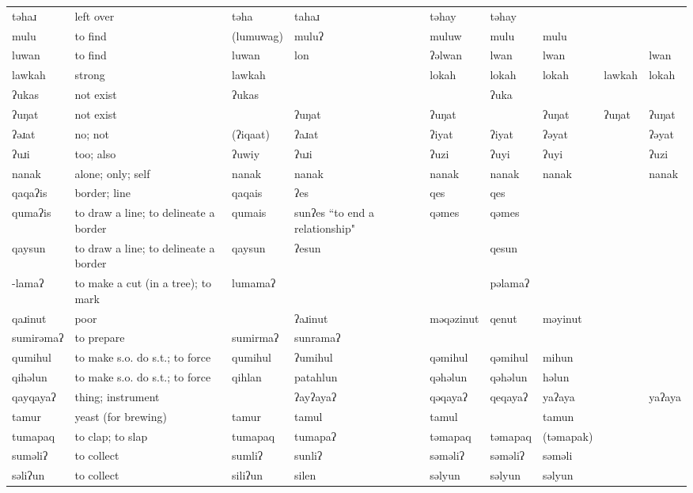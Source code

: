 \begin{landscape}
\begin{longtable}{*{9}{p{}}}
\text{*}təhaɹ & left over & təha & tahaɹ & təhay & təhay &  &  & \\
\text{*}mulu & to find & (lumuwag) & muluʔ & muluw & mulu & mulu &  & \\
\text{*}luwan & to find & luwan & lon & ʔəlwan & lwan & lwan &  & lwan\\
\text{*}lawkah & strong & lawkah &  & lokah & lokah & lokah & lawkah & lokah\\
\text{*}ʔukas & not exist & ʔukas &  &  & ʔuka &  &  & \\
\text{*}ʔuŋat & not exist &  & ʔuŋat & ʔuŋat &  & ʔuŋat & ʔuŋat & ʔuŋat\\
\text{*}ʔəɹat & no; not & (ʔiqaat) & ʔaɹat & ʔiyat & ʔiyat & ʔəyat &  & ʔəyat\\
\text{*}ʔuɹi & too; also & ʔuwiy & ʔuɹi & ʔuzi & ʔuyi & ʔuyi &  & ʔuzi\\
\text{*}nanak & alone; only; self & nanak & nanak & nanak & nanak & nanak &  & nanak\\
\text{*}qaqaʔis & border; line & qaqais & ʔes & qes & qes &  &  & \\
\text{*}qumaʔis & to draw a line; to delineate a border & qumais & sunʔes ``to end a relationship" & qəmes & qəmes &  &  & \\
\text{*}qaysun & to draw a line; to delineate a border & qaysun & ʔesun &  & qesun &  &  & \\
\text{*}-lamaʔ & to make a cut (in a tree); to mark & lumamaʔ &  &  & pəlamaʔ &  &  & \\
\text{*}qaɹinut & poor &  & ʔaɹinut & məqəzinut & qenut & məyinut &  & \\
\text{*}sumirəmaʔ & to prepare & sumirmaʔ & sunramaʔ &  &  &  &  & \\
\text{*}qumihul & to make s.o. do s.t.; to force & qumihul & ʔumihul & qəmihul & qəmihul & mihun &  & \\
\text{*}qihəlun & to make s.o. do s.t.; to force & qihlan & patahlun & qəhəlun & qəhəlun & həlun &  & \\
\text{*}qayqayaʔ & thing; instrument &  & ʔayʔayaʔ & qəqayaʔ & qeqayaʔ & yaʔaya &  & yaʔaya\\
\text{*}tamur & yeast (for brewing) & tamur & tamul & tamul &  & tamun &  & \\
\text{*}tumapaq & to clap; to slap & tumapaq & tumapaʔ & təmapaq & təmapaq & (təmapak) &  & \\
\text{*}suməliʔ & to collect & sumliʔ & sunliʔ & səməliʔ & səməliʔ & səməli &  & \\
\text{*}səliʔun & to collect & siliʔun & silen & səlyun & səlyun & səlyun &  & \\

\end{longtable}
\end{landscape}
